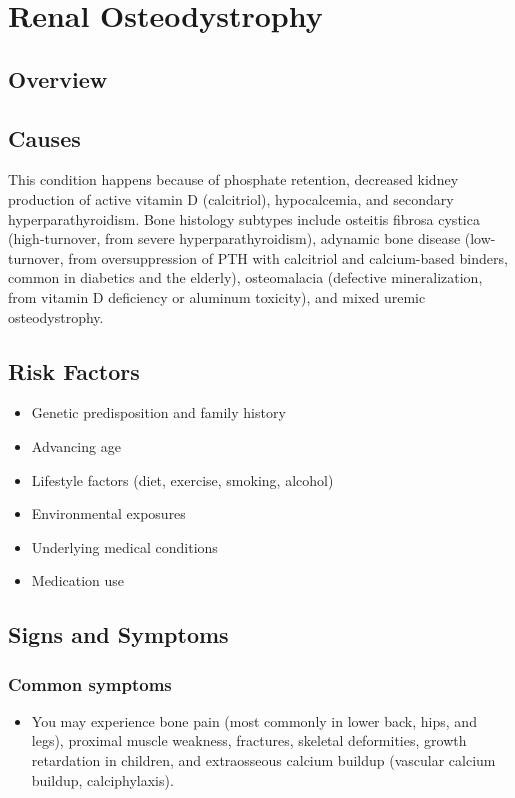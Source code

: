 \chapter{Renal Osteodystrophy}
\label{sec:Renal Osteodystrophy}

\section{Overview}

\section{Causes}
This condition happens because of phosphate retention, decreased kidney production of active vitamin D (calcitriol), hypocalcemia, and secondary hyperparathyroidism. Bone histology subtypes include osteitis fibrosa cystica (high-turnover, from severe hyperparathyroidism), adynamic bone disease (low-turnover, from oversuppression of PTH with calcitriol and calcium-based binders, common in diabetics and the elderly), osteomalacia (defective mineralization, from vitamin D deficiency or aluminum toxicity), and mixed uremic osteodystrophy.     
\section{Risk Factors}

\begin{itemize}[noitemsep]
  \item Genetic predisposition and family history
  \item Advancing age
  \item Lifestyle factors (diet, exercise, smoking, alcohol)
  \item Environmental exposures
  \item Underlying medical conditions
  \item Medication use
\end{itemize}
\section{Signs and Symptoms}

\subsection{Common symptoms}
\begin{itemize}[noitemsep]
  \item You may experience bone pain (most commonly in lower back, hips, and legs), proximal muscle weakness, fractures, skeletal deformities, growth retardation in children, and extraosseous calcium buildup (vascular calcium buildup, calciphylaxis). 
  \end{itemize}

